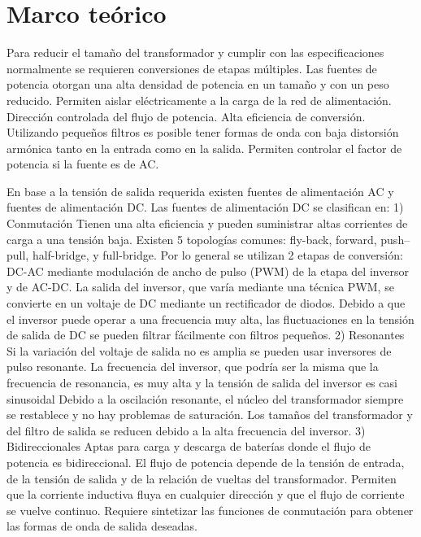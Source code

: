 \section{Marco teórico}

Para reducir el tamaño del transformador y cumplir con las especificaciones normalmente se requieren conversiones de etapas múltiples.
Las fuentes de potencia otorgan una alta densidad de potencia en un tamaño y con un peso reducido.  
Permiten aislar eléctricamente a la carga de la red de alimentación. 
Dirección controlada del flujo de potencia. 
Alta eficiencia de conversión. 
Utilizando pequeños filtros es posible tener formas de onda con baja distorsión armónica tanto en la entrada como en la salida. 
Permiten controlar el factor de potencia si la fuente es de AC. 

En base a la tensión de salida requerida existen fuentes de alimentación AC y fuentes de alimentación DC.
Las fuentes de alimentación DC se clasifican en:
1) Conmutación
Tienen una alta eficiencia y pueden suministrar altas corrientes de carga a una tensión baja.
Existen 5 topologías comunes: fly-back, forward, push–pull, half-bridge, y full-bridge.
Por lo general se utilizan 2 etapas de conversión: DC-AC mediante modulación de ancho de pulso (PWM) de la etapa del inversor y de AC-DC.
La salida del inversor, que varía mediante una técnica PWM, se convierte en un voltaje de DC mediante un rectificador de diodos. 
Debido a que el inversor puede operar a una frecuencia muy alta, las fluctuaciones en la tensión de salida de DC se pueden filtrar fácilmente con filtros pequeños. 
2) Resonantes
Si la variación del voltaje de salida no es amplia se pueden usar inversores de pulso resonante. 
La frecuencia del inversor, que podría ser la misma que la frecuencia de resonancia, es muy alta y la tensión de salida del inversor es casi sinusoidal 
Debido a la oscilación resonante, el núcleo del transformador siempre se restablece y no hay problemas de saturación. 
Los tamaños del transformador y del filtro de salida se reducen debido a la alta frecuencia del inversor.
3) Bidireccionales 
Aptas para carga y descarga de baterías donde el flujo de potencia es bidireccional. 
El flujo de potencia depende de la tensión de entrada, de la tensión de salida y de la relación de vueltas del transformador. 
Permiten que la corriente inductiva fluya en cualquier dirección y que el flujo de corriente se vuelve continuo.
Requiere sintetizar las funciones de conmutación para obtener las formas de onda de salida deseadas.

